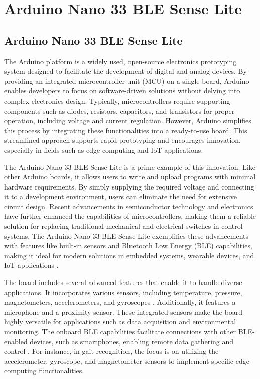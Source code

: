 %
%
%
%
\chapter{Arduino Nano 33 BLE Sense Lite}


\section{Arduino Nano 33 BLE Sense Lite}


	
	The Arduino platform is a widely used, open-source electronics prototyping system designed to facilitate the development of digital and analog devices. By providing an integrated microcontroller unit (MCU) on a single board, Arduino enables developers to focus on software-driven solutions without delving into complex electronics design. Typically, microcontrollers require supporting components such as diodes, resistors, capacitors, and transistors for proper operation, including voltage and current regulation. However, Arduino simplifies this process by integrating these functionalities into a ready-to-use board. This streamlined approach supports rapid prototyping and encourages innovation, especially in fields such as edge computing and IoT applications.
	
	The Arduino Nano 33 BLE Sense Lite is a prime example of this innovation. Like other Arduino boards, it allows users to write and upload programs with minimal hardware requirements. By simply supplying the required voltage and connecting it to a development environment, users can eliminate the need for extensive circuit design. Recent advancements in semiconductor technology and electronics have further enhanced the capabilities of microcontrollers, making them a reliable solution for replacing traditional mechanical and electrical switches in control systems. The Arduino Nano 33 BLE Sense Lite exemplifies these advancements with features like built-in sensors and Bluetooth Low Energy (BLE) capabilities, making it ideal for modern solutions in embedded systems, wearable devices, and IoT applications \cite{ArduinoGuide:2025}.
	
	The board includes several advanced features that enable it to handle diverse applications. It incorporates various sensors, including temperature, pressure, magnetometers, accelerometers, and gyroscopes \cite{Raj2019}. Additionally, it features a microphone and a proximity sensor. These integrated sensors make the board highly versatile for applications such as data acquisition and environmental monitoring. The onboard BLE capabilities facilitate connections with other BLE-enabled devices, such as smartphones, enabling remote data gathering and control \cite{Bagur2022}. For instance, in gait recognition, the focus is on utilizing the accelerometer, gyroscope, and magnetometer sensors to implement specific edge computing functionalities.
	

